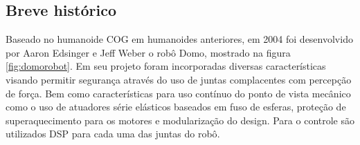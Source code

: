 

\subsection{Breve histórico}






Baseado no humanoide COG em humanoides anteriores, em 2004 foi desenvolvido por Aaron Edsinger e Jeff Weber o robô Domo, mostrado na figura \ref{fig:domorobot}. Em seu projeto foram incorporadas diversas características visando permitir segurança através do uso de juntas complacentes com percepção de força. Bem como características para uso contínuo do ponto de vista mecânico como o uso de atuadores série elásticos baseados em fuso de esferas, proteção de superaquecimento para os motores e modularização do design. Para o controle são utilizados DSP para cada uma das juntas do robô\cite{edsinger2004domo}.

